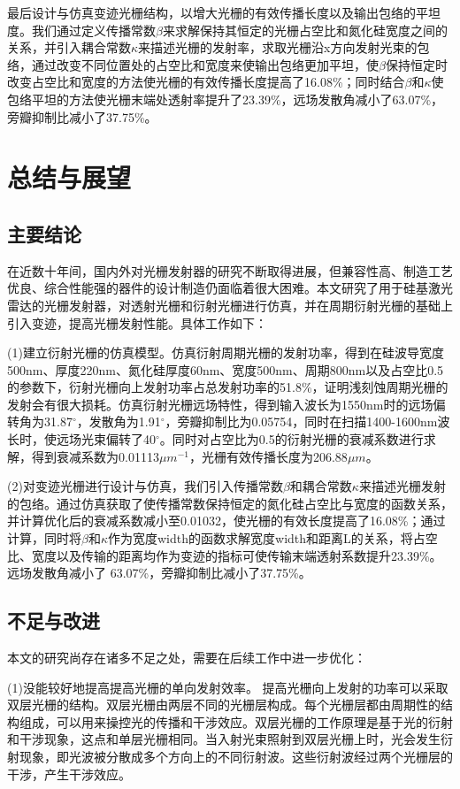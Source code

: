\documentclass[UTF8,a4paper,12pt]{ctexart}
\numberwithin{equation}{section}
\begin{document}
最后设计与仿真变迹光栅结构，以增大光栅的有效传播长度以及输出包络的平坦度。我们通过定义传播常数$\beta$来求解保持其恒定的光栅占空比和氮化硅宽度之间的关系，并引入耦合常数$\kappa$来描述光栅的发射率，求取光栅沿x方向发射光束的包络，通过改变不同位置处的占空比和宽度来使输出包络更加平坦，使$\beta$保持恒定时改变占空比和宽度的方法使光栅的有效传播长度提高了16.08\%；同时结合$\beta$和$\kappa$使包络平坦的方法使光栅末端处透射率提升了23.39\%，远场发散角减小了63.07\%，旁瓣抑制比减小了37.75\%。

\newpage
{}
\section{总结与展望}
\subsection{主要结论}
在近数十年间，国内外对光栅发射器的研究不断取得进展，但兼容性高、制造工艺优良、综合性能强的器件的设计制造仍面临着很大困难。本文研究了用于硅基激光雷达的光栅发射器，对透射光栅和衍射光栅进行仿真，并在周期衍射光栅的基础上引入变迹，提高光栅发射性能。具体工作如下：


(1)建立衍射光栅的仿真模型。仿真衍射周期光栅的发射功率，得到在硅波导宽度500nm、厚度220nm、氮化硅厚度60nm、宽度500nm、周期800nm以及占空比0.5的参数下，衍射光栅向上发射功率占总发射功率的51.8\%，证明浅刻蚀周期光栅的发射会有很大损耗。仿真衍射光栅远场特性，得到输入波长为1550nm时的远场偏转角为31.87$^\circ$，发散角为1.91$^\circ$，旁瓣抑制比为0.05754，同时在扫描1400-1600nm波长时，使远场光束偏转了40$^\circ$。同时对占空比为0.5的衍射光栅的衰减系数进行求解，得到衰减系数为0.01113$\mu m^{-1}$，光栅有效传播长度为206.88$\mu m$。

(2)对变迹光栅进行设计与仿真，我们引入传播常数$\beta$和耦合常数$\kappa$来描述光栅发射的包络。通过仿真获取了使传播常数保持恒定的氮化硅占空比与宽度的函数关系，并计算优化后的衰减系数减小至0.01032，使光栅的有效长度提高了16.08\%；通过计算，同时将$\beta$和$\kappa$作为宽度width的函数求解宽度width和距离L的关系，将占空比、宽度以及传输的距离均作为变迹的指标可使传输末端透射系数提升23.39\%。远场发散角减小了 63.07\%，旁瓣抑制比减小了37.75\%。

\subsection{不足与改进}
本文的研究尚存在诸多不足之处，需要在后续工作中进一步优化：

(1)没能较好地提高提高光栅的单向发射效率。
提高光栅向上发射的功率可以采取双层光栅的结构。双层光栅由两层不同的光栅层构成。每个光栅层都由周期性的结构组成，可以用来操控光的传播和干涉效应。双层光栅的工作原理是基于光的衍射和干涉现象，这点和单层光栅相同。当入射光束照射到双层光栅上时，光会发生衍射现象，即光波被分散成多个方向上的不同衍射波。这些衍射波经过两个光栅层的干涉，产生干涉效应。
\end{document}
